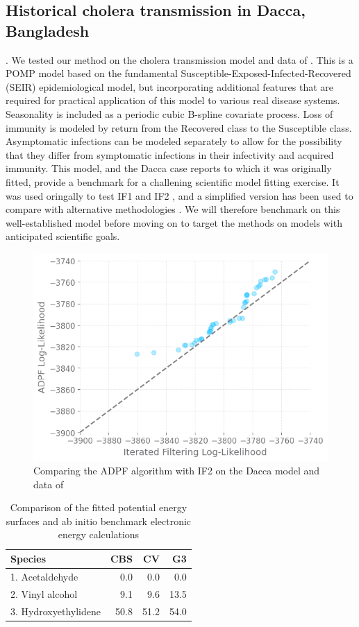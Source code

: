 \documentclass[9pt,twocolumn,twoside]{pnas-new}
\begin{document}
\subsection*{Historical cholera transmission in Dacca, Bangladesh}.
We tested our method on the cholera transmission model and data of \citep{king08}.
This is a POMP model based on the fundamental Susceptible-Exposed-Infected-Recovered (SEIR) epidemiological model, but incorporating additional features that are required for practical application of this model to various real disease systems.
Seasonality is included as a periodic cubic B-spline covariate process.
Loss of immunity is modeled by return from the Recovered class to the Susceptible class.
Asymptomatic infections can be modeled separately to allow for the possibility that they differ from symptomatic infections in their infectivity and acquired immunity.
This model, and the Dacca case reports to which it was originally fitted, provide a benchmark for a challening scientific model fitting exercise.
It was used oringally to test IF1 \citep{ionides06-pnas} and IF2  \citep{ionides15}, and a simplified version has been used to compare with alternative methodologies \citep{fasiolo16}.
We will therefore benchmark on this well-established model before moving on to target the methods on models with anticipated scientific goals.


\begin{figure}%
\centering
\includegraphics[width=.8\linewidth]{23-09-05-adpf-vs-if2.png}
\caption{Comparing the ADPF algorithm with IF2 on the Dacca model and data of \citep{king08}}
  \label{fig:dacca-fit}
\end{figure}



\begin{table}[t!]
\centering
\caption{Comparison of the fitted potential energy surfaces and ab initio benchmark electronic energy calculations}
\begin{tabular}{lrrr}
Species & CBS & CV & G3 \\
\midrule
1. Acetaldehyde & 0.0 & 0.0 & 0.0 \\
2. Vinyl alcohol & 9.1 & 9.6 & 13.5 \\
3. Hydroxyethylidene & 50.8 & 51.2 & 54.0\\
\bottomrule
\end{tabular}

\end{table}
\end{document}

